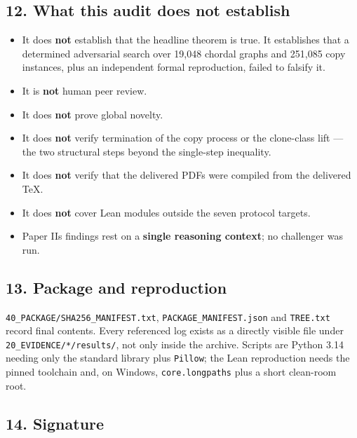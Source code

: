 \documentclass[
  9pt,
  a4paper,
]{article}
\providecommand{\tightlist}{%
  \setlength{\itemsep}{0pt}\setlength{\parskip}{0pt}}
\begin{document}
\subsection{12. What this audit does not
establish}\label{12-what-this-audit-does-not-establish}

\begin{itemize}
\tightlist
\item
  It does \textbf{not} establish that the headline theorem is true. It
  establishes that a determined adversarial search over 19,048 chordal
  graphs and 251,085 copy instances, plus an independent formal
  reproduction, failed to falsify it.
\item
  It is \textbf{not} human peer review.
\item
  It does \textbf{not} prove global novelty.
\item
  It does \textbf{not} verify termination of the copy process or the
  clone-class lift --- the two structural steps beyond the single-step
  inequality.
\item
  It does \textbf{not} verify that the delivered PDFs were compiled from
  the delivered TeX.
\item
  It does \textbf{not} cover Lean modules outside the seven protocol
  targets.
\item
  Paper II\textquotesingle s findings rest on a \textbf{single reasoning
  context}; no challenger was run.
\end{itemize}

\subsection{13. Package and
reproduction}\label{13-package-and-reproduction}

\texttt{40\_PACKAGE/SHA256\_MANIFEST.txt},
\texttt{PACKAGE\_MANIFEST.json} and \texttt{TREE.txt} record final
contents. Every referenced log exists as a directly visible file under
\texttt{20\_EVIDENCE/*/results/}, not only inside the archive. Scripts
are Python 3.14 needing only the standard library plus \texttt{Pillow};
the Lean reproduction needs the pinned toolchain and, on Windows,
\texttt{core.longpaths} plus a short clean-room root.

\subsection{14. Signature}\label{14-signature}
\end{document}
